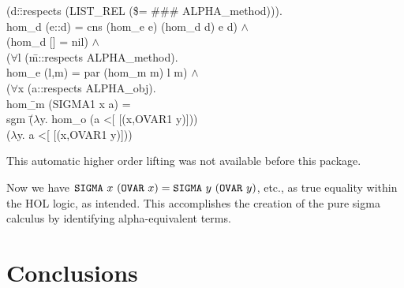 \documentclass[envcountsame,runningheads]{llncs}
\begin{document}
{\begin{tabbing}
\>\>\>\>(d:\=:respects (LIST\_REL (\$= \#\#\# ALPHA\_method))). \\
\>\>\>\>\> hom\_d (e::d) = cns (hom\_e e) (hom\_d d) e d) $\wedge$ \\
\>\>\>(hom\_d [] = nil) $\wedge$ \\
\>\>\>($\forall$l (\=m::respects ALPHA\_method). \\
\>\>\>\>   hom\_e (l,m) = par (hom\_m m) l m) $\wedge$ \\
\>\>\>($\forall$x (a::respects ALPHA\_obj). \\
\>\>\>\>   hom\=\_m (SIGMA1 x a) = \\
\>\>\>\>\>    sgm \=($\lambda$y. hom\_o (a <[ [(x,OVAR1 y)])) \\
\>\>\>\>\>\>      ($\lambda$y. a <[ [(x,OVAR1 y)]))
\end{tabbing}}
This automatic higher order lifting was not available before this package.

Now we have 
$\mbox{\tt SIGMA}\ x\ (\mbox{\tt OVAR}\ x) = 
 \mbox{\tt SIGMA}\ y\ (\mbox{\tt OVAR}\ y)$, etc., as true equality
within the HOL logic, as intended.
This accomplishes the creation of the pure sigma calculus
by identifying alpha-equivalent terms.


%
\section{Conclusions}
%
\label{conclusions}
\end{document}
